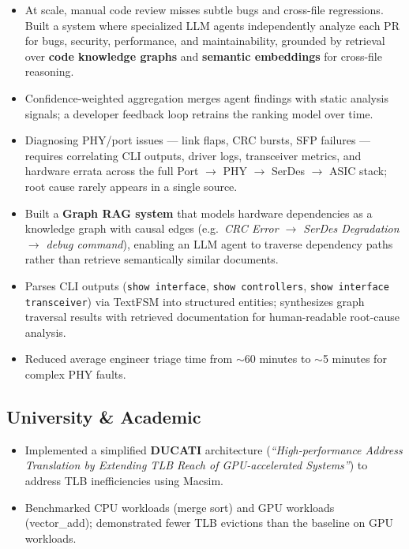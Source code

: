 \documentclass{resume}
\begin{document}
\begin{itemize}\setlength{\itemsep}{0pt}\setlength{\parskip}{0pt}
    \item At scale, manual code review misses subtle bugs and cross-file regressions. Built a system where specialized LLM agents independently analyze each PR for bugs, security, performance, and maintainability, grounded by retrieval over \textbf{code knowledge graphs} and \textbf{semantic embeddings} for cross-file reasoning.
    \item Confidence-weighted aggregation merges agent findings with static analysis signals; a developer feedback loop retrains the ranking model over time.
\end{itemize}

\begin{itemize}\setlength{\itemsep}{0pt}\setlength{\parskip}{0pt}
    \item Diagnosing PHY/port issues --- link flaps, CRC bursts, SFP failures --- requires correlating CLI outputs, driver logs, transceiver metrics, and hardware errata across the full Port $\rightarrow$ PHY $\rightarrow$ SerDes $\rightarrow$ ASIC stack; root cause rarely appears in a single source.
    \item Built a \textbf{Graph RAG system} that models hardware dependencies as a knowledge graph with causal edges (e.g.\ \textit{CRC Error $\rightarrow$ SerDes Degradation $\rightarrow$ debug command}), enabling an LLM agent to traverse dependency paths rather than retrieve semantically similar documents.
    \item Parses CLI outputs (\texttt{show interface}, \texttt{show controllers}, \texttt{show interface transceiver}) via TextFSM into structured entities; synthesizes graph traversal results with retrieved documentation for human-readable root-cause analysis.
    \item Reduced average engineer triage time from $\sim$60 minutes to $\sim$5 minutes for complex PHY faults.
\end{itemize}

\subsection{University \& Academic}

\begin{itemize}\setlength{\itemsep}{0pt}\setlength{\parskip}{0pt}
    \item Implemented a simplified \textbf{DUCATI} architecture (\textit{``High-performance Address Translation by Extending TLB Reach of GPU-accelerated Systems''}) to address TLB inefficiencies using Macsim.
    \item Benchmarked CPU workloads (merge sort) and GPU workloads (vector\_add); demonstrated fewer TLB evictions than the baseline on GPU workloads.
\end{itemize}
\end{document}
